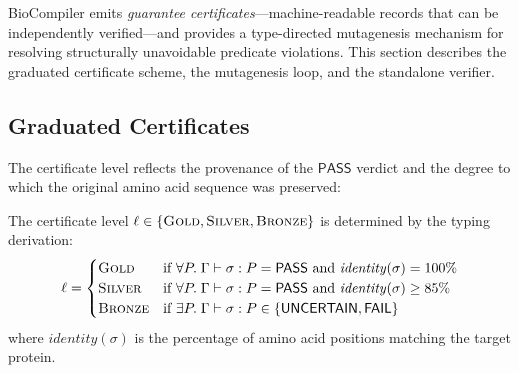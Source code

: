 \documentclass[acmsmall,review,anonymous]{acmart}
\newcommand{\PASS}{\ensuremath{\mathsf{PASS}}\xspace}
\newcommand{\FAIL}{\ensuremath{\mathsf{FAIL}}\xspace}
\newcommand{\UNCERTAIN}{\ensuremath{\mathsf{UNCERTAIN}}\xspace}
\newcommand{\seq}{\sigma}
\newcommand{\pred}{P}
\newcommand{\judg}[3]{#1 \vdash #2 : #3}
\newcommand{\GOLD}{\textsc{Gold}\xspace}
\newcommand{\SILVER}{\textsc{Silver}\xspace}
\newcommand{\BRONZE}{\textsc{Bronze}\xspace}
\begin{document}
BioCompiler emits \emph{guarantee certificates}---machine-readable
records that can be independently verified---and provides a
type-directed mutagenesis mechanism for resolving structurally
unavoidable predicate violations.
This section describes the graduated certificate scheme, the
mutagenesis loop, and the standalone verifier.

\subsection{Graduated Certificates}\label{sec:certs}

The certificate level reflects the provenance of the \PASS{} verdict
and the degree to which the original amino acid sequence was preserved:

\begin{definition}
The certificate level $\ell \in \{\GOLD, \SILVER, \BRONZE\}$ is
determined by the typing derivation:
\[
  \ell =
  \begin{cases}
    \GOLD & \text{if } \forall \pred.\;
            \judg{\Gamma}{\seq}{\pred} = \PASS
            \text{ and } \mathit{identity}(\seq) = 100\% \\
    \SILVER & \text{if } \forall \pred.\;
              \judg{\Gamma}{\seq}{\pred} = \PASS
              \text{ and } \mathit{identity}(\seq) \ge 85\% \\
    \BRONZE & \text{if } \exists \pred.\;
              \judg{\Gamma}{\seq}{\pred} \in \{\UNCERTAIN, \FAIL\}
  \end{cases}
\]
where $\mathit{identity}(\seq)$ is the percentage of amino acid
positions matching the target protein.
\end{definition}
\end{document}

